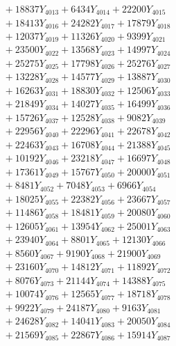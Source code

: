 \documentclass[a4paper,10pt]{article}
\begin{document}
{\begin{align}
&\;  + 18837 Y_{4013} + 6434 Y_{4014} + 22200 Y_{4015} \\[0.3ex]
&\;  + 18413 Y_{4016} + 24282 Y_{4017} + 17879 Y_{4018} \\[0.5ex]\allowbreak
&\;  + 12037 Y_{4019} + 11326 Y_{4020} + 9399 Y_{4021} \\[0.3ex]
&\;  + 23500 Y_{4022} + 13568 Y_{4023} + 14997 Y_{4024} \\[0.3ex]
&\;  + 25275 Y_{4025} + 17798 Y_{4026} + 25276 Y_{4027} \\[0.3ex]
&\;  + 13228 Y_{4028} + 14577 Y_{4029} + 13887 Y_{4030} \\[0.3ex]
&\;  + 16263 Y_{4031} + 18830 Y_{4032} + 12506 Y_{4033} \\[0.3ex]
&\;  + 21849 Y_{4034} + 14027 Y_{4035} + 16499 Y_{4036} \\[0.3ex]
&\;  + 15726 Y_{4037} + 12528 Y_{4038} + 9082 Y_{4039} \\[0.3ex]
&\;  + 22956 Y_{4040} + 22296 Y_{4041} + 22678 Y_{4042} \\[0.3ex]
&\;  + 22463 Y_{4043} + 16708 Y_{4044} + 21388 Y_{4045} \\[0.3ex]
&\;  + 10192 Y_{4046} + 23218 Y_{4047} + 16697 Y_{4048} \\[0.5ex]\allowbreak
&\;  + 17361 Y_{4049} + 15767 Y_{4050} + 20000 Y_{4051} \\[0.3ex]
&\;  + 8481 Y_{4052} + 7048 Y_{4053} + 6966 Y_{4054} \\[0.3ex]
&\;  + 18025 Y_{4055} + 22382 Y_{4056} + 23667 Y_{4057} \\[0.3ex]
&\;  + 11486 Y_{4058} + 18481 Y_{4059} + 20080 Y_{4060} \\[0.3ex]
&\;  + 12605 Y_{4061} + 13954 Y_{4062} + 25001 Y_{4063} \\[0.3ex]
&\;  + 23940 Y_{4064} + 8801 Y_{4065} + 12130 Y_{4066} \\[0.3ex]
&\;  + 8560 Y_{4067} + 9190 Y_{4068} + 21900 Y_{4069} \\[0.3ex]
&\;  + 23160 Y_{4070} + 14812 Y_{4071} + 11892 Y_{4072} \\[0.3ex]
&\;  + 8076 Y_{4073} + 21144 Y_{4074} + 14388 Y_{4075} \\[0.3ex]
&\;  + 10074 Y_{4076} + 12565 Y_{4077} + 18718 Y_{4078} \\[0.5ex]\allowbreak
&\;  + 9922 Y_{4079} + 24187 Y_{4080} + 9163 Y_{4081} \\[0.3ex]
&\;  + 24628 Y_{4082} + 14041 Y_{4083} + 20050 Y_{4084} \\[0.3ex]
&\;  + 21569 Y_{4085} + 22867 Y_{4086} + 15914 Y_{4087} \\[0.3ex]

\end{align}}
\end{document}
